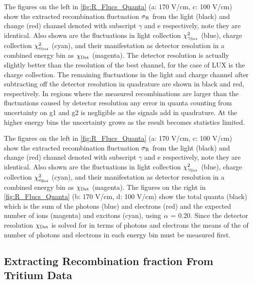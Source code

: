 The figures on the left in \ref{fig:R_Flucs_Quanta} (a: 170 V/cm, c: 100 V/cm)  show the extracted recombination fluctuation $\rm \sigma_R$ from the light (black) and change (red) channel denoted with subscript $\gamma$ and e respectively, note they are identical. Also shown are the fluctuations in light collection $\rm \chi_{\gamma_{Det}}^2$ (blue), charge collection $\rm \chi_{e_{Det}}^2$ (cyan), and their manifestation as detector resolution in a combined energy bin as $\rm \chi_{Det}$ (magenta). The detector resolution is actually slightly better than the resolution of the best channel, for the case of LUX is the charge collection. The remaining fluctuations in the light and charge channel after subtracting off the detector resolution in quadrature are shown in black and red, respectively. In regions where the measured recombinations are larger than the fluctuations caused by detector resolution any error in quanta counting from uncertainty on g1 and g2 is negligible as the signals add in quadrature. At the higher energy bins the uncertainty grows as the result becomes statistics limited. 

The figures on the left in \ref{fig:R_Flucs_Quanta} (a: 170 V/cm, c: 100 V/cm) show the extracted recombination fluctuation $\rm \sigma_R$ from the light (black) and change (red) channel denoted with subscript $\gamma$ and e respectively, note they are identical. Also shown are the fluctuations in light collection $\rm \chi_{\gamma_{Det}}^2$ (blue), charge collection $\rm \chi_{e_{Det}}^2$ (cyan), and their manifestation as detector resolution in a combined energy bin as $\rm \chi_{Det}$ (magenta).  The figures on the right in \ref{fig:R_Flucs_Quanta} (b: 170 V/cm, d: 100 V/cm) show the total quanta (black) which is the sum of the photons (blue) and electrons (red) and the expected number of ions (magenta) and excitons (cyan), using $\rm \alpha$ = 0.20. Since the detector resolution $\rm \chi_{Det}$ is solved for in terms of photons and electrons the means of the of number of photons and electrons in each energy bin must be measured first.


\subsection{Extracting Recombination fraction From Tritium Data}

